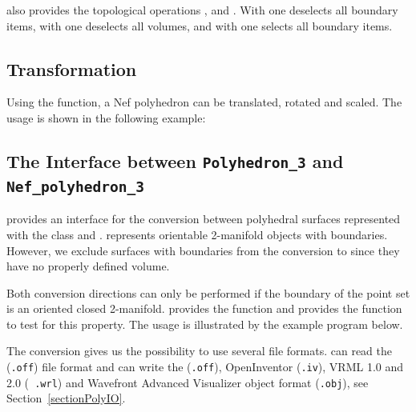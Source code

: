  also provides the topological operations
,  and . With
 one deselects all boundary items, with
 one deselects all volumes, and with 
one selects all boundary items.


\subsection{Transformation}

Using the  function, a Nef polyhedron can be translated, 
rotated and scaled. The usage is shown in the following example:


\subsection{The Interface between \texttt{Polyhedron\_3} and 
    \texttt{Nef\_polyhedron\_3}}
\label{subsectionNef_3Polyhedron}

 provides an interface for the conversion between
polyhedral surfaces represented with the  class
and .   represents orientable
2-manifold objects with boundaries. However, we exclude surfaces with
boundaries from the conversion to  since they
have no properly defined volume.

Both conversion directions can only be performed if the boundary of
the point set is an oriented closed 2-manifold.
 provides the function  and
 provides the function  to test for
this property. The usage is illustrated by the example program below.

The conversion gives us the possibility to use several file formats.
 can read the ({\tt .off}) file format and can write
the ({\tt .off}), OpenInventor ({\tt .iv}), VRML 1.0 and 2.0 ({\tt
  .wrl}) and Wavefront Advanced Visualizer object format ({\tt .obj}),
see Section~\ref{sectionPolyIO}.


